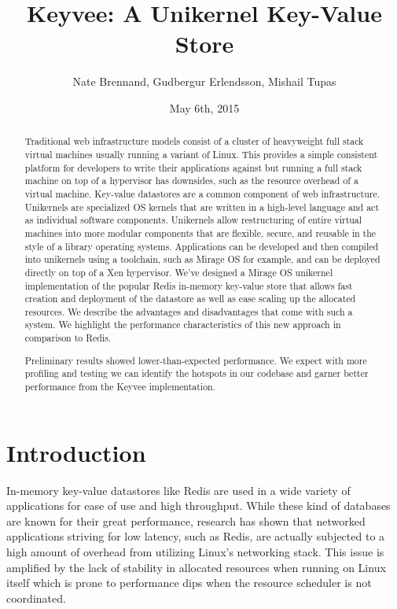 \documentclass[english,10pt,twocolumn]{article}
\begin{document}
\title{Keyvee: A Unikernel Key-Value Store}
\author{Nate Brennand, Gudbergur Erlendsson, Mishail Tupas}
\date{May 6th, 2015}
\maketitle
\thispagestyle{empty}


\begin{abstract}
Traditional web infrastructure models consist of a cluster of heavyweight full stack virtual machines usually running a variant of Linux.
This provides a simple consistent platform for developers to write their applications against but running a full stack machine on top of a hypervisor has downsides, such as the resource overhead of a virtual machine.
Key-value datastores are a common component of web infrastructure.
Unikernels are specialized OS kernels that are written in a high-level language and act as individual software components.
Unikernels allow restructuring of entire virtual machines into more modular components that are flexible, secure, and reusable in the style of a library operating systems. Applications can be developed and then compiled into unikernels using a toolchain, such as Mirage OS for example, and can be deployed directly on top of a Xen hypervisor.
We've designed a Mirage OS\cite{mirage} unikernel implementation of the popular Redis\cite{redis} in-memory key-value store that allows fast creation and deployment of the datastore as well as ease scaling up the allocated resources.
We describe the advantages and disadvantages that come with such a system.
We highlight the performance characteristics of this new approach in comparison to Redis.

Preliminary results showed lower-than-expected performance.
We expect with more profiling and testing we can identify the hotspots in our codebase and garner better performance from the Keyvee implementation.
\end{abstract}


\section{Introduction}
In-memory key-value datastores like Redis are used in a wide variety of applications for ease of use and high throughput.
While these kind of databases are known for their great performance, research has shown that networked applications striving for low latency, such as Redis, are actually subjected to a high amount of overhead from utilizing Linux's networking stack.\cite{arrakis}
This issue is amplified by the lack of stability in allocated resources when running on Linux itself which is prone to performance dips when the resource scheduler is not coordinated. 
\end{document}

